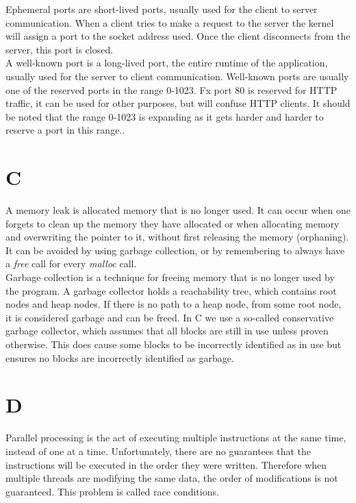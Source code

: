 \documentclass[11pt]{report}
\begin{document}
Ephemeral ports are short-lived ports, usually used for the client to server communication. When a client tries to make a request to the server the kernel will assign a port to the socket address used. Once the client disconnects from the server, this port is closed.\\[1ex]

A well-known port is a long-lived port, the entire runtime of the application, usually used for the server to client communication. Well-known ports are usually one of the reserved ports in the range 0-1023. Fx port 80 is reserved for HTTP traffic, it can be used for other purposes, but will confuse HTTP clients. It should be noted that the range 0-1023 is expanding as it gets harder and harder to reserve a port in this range.\cite{registered-port}.\\[1ex] 

\section{C}
A memory leak is allocated memory that is no longer used. It can occur when one forgets to clean up the memory they have allocated or when allocating memory and overwriting the pointer to it, without first releasing the memory (orphaning). It can be avoided by using garbage collection, or by remembering to always have a \textit{free} call for every \textit{malloc} call.\\[1ex]

Garbage collection is a technique for freeing memory that is no longer used by the program. A garbage collector holds a reachability tree, which contains root nodes and heap nodes. If there is no path to a heap node, from some root node, it is considered garbage and can be freed. In C we use a so-called conservative garbage collector, which assumes that all blocks are still in use unless proven otherwise. This does cause some blocks to be incorrectly identified as in use but ensures no blocks are incorrectly identified as garbage.\\[1ex]

\section{D}
Parallel processing is the act of executing multiple instructions at the same time, instead of one at a time. Unfortunately, there are no guarantees that the instructions will be executed in the order they were written. Therefore when multiple threads are modifying the same data, the order of modifications is not guaranteed. This problem is called race conditions.\\[1ex]
\end{document}
